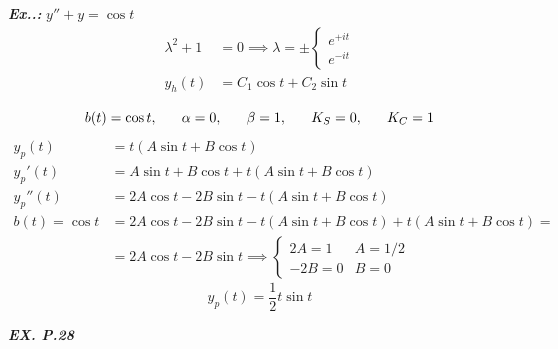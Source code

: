 \documentclass[a4paper]{article}
\begin{document}
\vspace{2ex}\textbf{\textit{Ex.\thesection.\theex: }}$y''+y=\cos t$
\begin{align}
\lambda^{2}+1&=0\implies \lambda=\pm \begin{cases}
e^{ +it } \\
e^{ -it }
\end{cases} \\
y_{h}(t)&=C_{1}\cos t+C_{2}\sin t \\
\end{align}
$$
b(t)=\cos t,\hspace{4ex}\alpha=0,\hspace{4ex}\beta=1,\hspace{4ex}K_{S}=0,\hspace{4ex}K_{C}=1
$$
\begin{align}
y_{p}(t)&=t(A\sin t+B\cos t) \\
y_{p}'(t)&=A\sin t+B\cos t+t(A\sin t+B\cos t) \\
y_{p}''(t)&=2A\cos t-2B\sin t-t(A\sin t+B\cos t) \\
b(t)=\cos t&=2A\cos t-2B\sin t-t(A\sin t+B\cos t)+t(A\sin t+B\cos t)= \\
&=2A\cos t-2B\sin t\implies \begin{cases}
2A=1  & A=1 / 2\\
-2B=0 & B=0
\end{cases}
\end{align}
$$
\boxed{y_{p}(t)=\frac{1}{2}t\sin t}
$$

\textbf{\textit{EX. P.28}}
\end{document}
